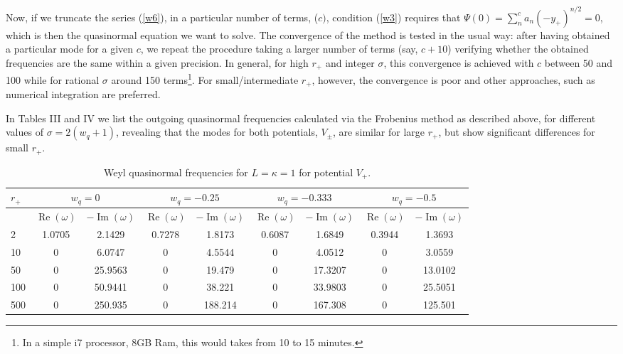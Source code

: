 \documentclass[preprint]{revtex4-1}
\renewcommand{\Re}{\operatorname{Re}}
\renewcommand{\Im}{\operatorname{Im}}
\begin{document}
Now, if we truncate the series (\ref{w6}), in a particular number of terms, ($c)$, condition (\ref{w3}) requires that $\Psi(0)= \sum_n^c a_n (-y_+)^{n/2} = 0$, which is then the quasinormal equation we want to solve. The convergence of the method is tested in the usual way: after having obtained a particular mode for a given $c$, we repeat the procedure taking a larger number of terms (say, $c+10$) verifying whether the obtained frequencies are the same within a given precision. In general, for high $r_+$ and integer $\sigma$, this convergence is achieved with $c$ between 50 and 100 while for rational $\sigma$ around 150 terms\footnote{In a simple i7 processor, 8GB Ram, this would takes from 10 to 15 minutes.}. For small/intermediate $r_+$, however, the convergence is poor and other approaches, such as numerical integration are preferred. 

In Tables III and IV we list the outgoing quasinormal frequencies calculated via the Frobenius method as described above, for different values of $\sigma = 2(w_q +1)$, revealing that the modes for both potentials, $V_\pm$, are similar for large $r_+$, but show significant differences for small $r_+$. 

\begin{table}[htbp]
\centering
  \begin{tabular}{lSSSSSSSS}
    \hline
     &
       &
       &
       &
      \\
      \hline
      & {$\Re(\omega)$} & {$-\Im(\omega)$} & {$\Re(\omega)$} & {$-\Im(\omega)$} & {$\Re(\omega)$} & {$-\Im(\omega)$} & {$\Re(\omega)$} & {$-\Im(\omega)$} \\
         & 1.0705 &2.1429  &0.7278 & 1.8173 & 0.6087 & 1.6849  & 0.3944 & 1.3693   \\
     10  & 0      & 6.0747    &0      & 4.5544 & 0      & 4.0512  & 0      & 3.0559   \\
     50  & 0      & 25.9563  &0      & 19.479 & 0      & 17.3207 & 0      & 13.0102  \\
     100 & 0     & 50.9441 &0      & 38.221 & 0      & 33.9803 & 0      & 25.5051  \\
     500 & 0     & 250.935 &0      & 188.214& 0      & 167.308 & 0      & 125.501  \\
    \hline
  \end{tabular}
  \caption{Weyl quasinormal frequencies for $L=\kappa=1$ for potential $V_+$.}
\label{Weyl_kappa1_vplus}
\end{table}
\end{document}
